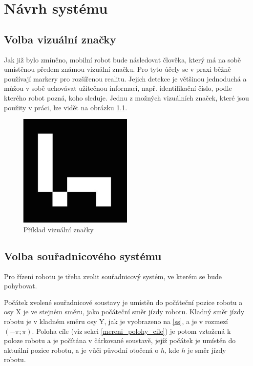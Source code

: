 \documentclass[twoside]{ctuthesis}
\theoremstyle{plain}
\theoremstyle{definition}
\theoremstyle{note}
\begin{document}
\chapter{Návrh systému}
\section{Volba vizuální značky}
Jak již bylo zmíněno, mobilní robot bude následovat člověka, který má na sobě umístěnou předem známou vizuální značku. Pro tyto účely se v praxi běžně používají markery pro rozšířenou realitu. Jejich detekce je většinou jednoduchá a můžou v sobě uchovávat užitečnou informaci, např. identifikační číslo, podle kterého robot pozná, koho sleduje. Jednu z možných vizuálních značek, které jsou použity v práci, lze vidět na obrázku \ref{am}.

\begin{figure}[H]
	\caption{Příklad vizuální značky}
	
	\label{am}
	\includegraphics[width=0.5\textwidth]{images/2/ArucoMarker.jpg}
\end{figure}

\section{Volba souřadnicového systému}

Pro řízení robotu je třeba zvolit souřadnicový systém, ve kterém se bude pohybovat. 

Počátek zvolené souřadnicové soustavy je umístěn do počáteční pozice robotu a osy X je ve stejném směru, jako počáteční směr jízdy robotu. Kladný směr jízdy robotu je v kladném směru osy Y, jak je vyobrazeno na \ref{ss}, a je v rozmezí $\left(-\pi; \pi\right)$. Poloha cíle (viz sekci \ref{mereni_polohy_cile}) je potom vztažená k poloze robotu a je počítána v čárkované soustavě, jejíž počátek je umístěn do aktuální pozice robotu, a je vůči původní otočená o $h$, kde $h$ je směr jízdy robotu.
\end{document}
